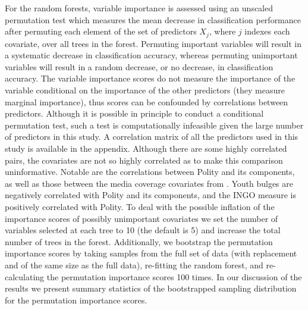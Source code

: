 \documentclass[12pt]{article}
\begin{document}
For the random forests, variable importance is assessed using an unscaled permutation test which measures the mean decrease in classification performance after permuting each element of the set of predictors $X_j$, where $j$ indexes each covariate, over all trees in the forest. Permuting important variables will result in a systematic decrease in classification accuracy, whereas permuting unimportant variables will result in a random decrease, or no decrease, in classification accuracy. The variable importance scores do not measure the importance of the variable conditional on the importance of the other predictors (they measure marginal importance), thus scores can be confounded by correlations between predictors. Although it is possible in principle to conduct a conditional permutation test, such a test is computationally infeasible given the large number of predictors in this study. A correlation matrix of all the predictors used in this study is available in the appendix. Although there are some highly correlated pairs, the covariates are not so highly correlated as to make this comparison uninformative. Notable are the correlations between Polity and its components, as well as those between the media coverage covariates from \citet{RonRamosRodgers2005}. Youth bulges are negatively correlated with Polity and its components, and the INGO measure is positively correlated with Polity. To deal with the possible inflation of the importance scores of possibly unimportant covariates we set the number of variables selected at each tree to 10 (the default is 5) and increase the total number of trees in the forest. Additionally, we bootstrap the permutation importance scores by taking samples from the full set of data (with replacement and of the same size as the full data), re-fitting the random forest, and re-calculating the permutation importance scores 100 times. In our discussion of the results we present summary statistics of the bootstrapped sampling distribution for the permutation importance scores.
\end{document}
